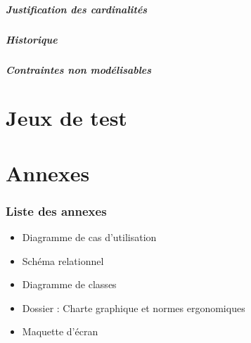\documentclass[10pt,a4paper]{article}
\begin{document}
				\subsubsection{Justification des cardinalités}
					
				\subsubsection{Historique}
					
				\subsubsection{Contraintes non modélisables}
					
	\newpage
	\part{Jeux de test}
		
	\newpage
	\part{Annexes}
		\section*{Liste des annexes}
		\begin{itemize}
			\item Diagramme de cas d'utilisation
			\item Schéma relationnel
			\item Diagramme de classes
			\item Dossier : Charte graphique et normes ergonomiques
			\item Maquette d'écran
		\end{itemize}
\end{document}
